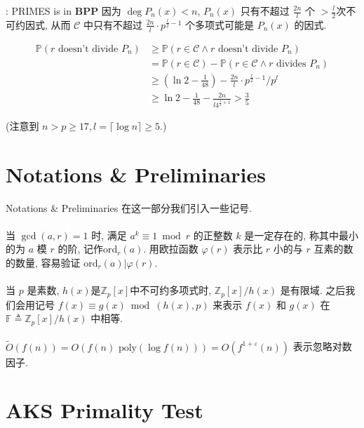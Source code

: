 \documentclass{beamer}
\def\P#1{\mathbb{P}\left({#1}\right)}
\def\ge{\geqslant}
\def\ord{\textrm{ord}}
\begin{document}
\begin{frame}{\cite{AB99}: \textsf{PRIMES} is in \textbf{BPP}}
	因为 $\deg P_n(x) < n$,  $P_n(x)$ 只有不超过 $\frac{2n}{l}$ 个 $>\frac{l}{2}$次不可约因式, 从而 $\mathcal C$ 中只有不超过 $\frac{2n}{l} \cdot p^{\frac l2 - 1}$ 个多项式可能是 $P_n(x)$ 的因式.

	\begin{align*}
		\P{r \textrm{ doesn't divide } P_n} &\ge \P{r \in \mathcal C \wedge r \textrm{ doesn't divide } P_n}\\
		&= \P{r \in \mathcal C} - \P{r \in \mathcal C \wedge r \textrm{ divides } P_n}\\
		&\ge \left(\ln 2 - \frac{1}{48}\right) - \frac{2n}{l} \cdot p^{\frac l2 - 1} / p^l\\
		& \ge \ln 2 - \frac{1}{48} - \frac{2n}{l4^{\frac l2 + 1}} > \frac 35
	\end{align*}

	(注意到 $n > p \ge 17, l = \lceil \log n \rceil \ge 5$.)
\end{frame}

\section{Notations \& Preliminaries}
\begin{frame}{Notations \& Preliminaries}
	在这一部分我们引入一些记号.\\~\\

	当 $\gcd(a, r) = 1$ 时, 满足 $a^k \equiv 1 \bmod r$ 的正整数 $k$ 是一定存在的, 称其中最小的为 $a$ 模 $r$ 的阶, 记作$\ord_{r}(a)$. 用欧拉函数 $\varphi(r)$ 表示比 $r$ 小的与 $r$ 互素的数的数量, 容易验证 $\ord_r(a) | \varphi(r)$.\\~\\

	当 $p$ 是素数, $h(x)$是$\mathbb Z_p[x]$中不可约多项式时, $\mathbb Z_p[x] / h(x)$ 是有限域. 之后我们会用记号 $f(x) \equiv g(x) \bmod (h(x), p)$ 来表示 $f(x)$ 和 $g(x)$ 在 $\mathbb F \triangleq \mathbb Z_p[x] / h(x)$ 中相等.\\~\\

	$\tilde O(f(n)) = O(f(n) \textrm{ poly}(\log f(n))) = O(f^{1 + \varepsilon}(n)) $ 表示忽略对数因子.

\end{frame}
\section{AKS Primality Test}
\end{document}
